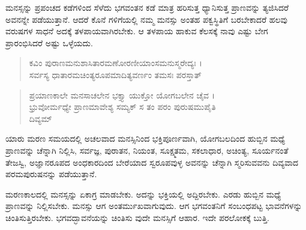 ಮನಸ್ಸನ್ನು ಪ್ರಪಂಚದ ಕಡೆಗಳಿಂದ ಸೆಳೆದು ಭಗವಂತನ ಕಡೆ ಮಾತ್ರ ಹರಿಸುತ್ತ ಧ್ಯಾನಿಸುತ್ತ ಪ್ರಾಣವನ್ನು ತ್ಯಜಿಸಿದರೆ ಅವನನ್ನೇ ಪಡೆಯುತ್ತಾನೆ. ಆದರೆ ಕೊನೆ ಗಳಿಗೆಯಲ್ಲಿ ನಮ್ಮ ಮನಸ್ಸು ಅಂತಹ ಪಕ್ವಸ್ಥಿತಿಗೆ ಬರಬೇಕಾದರೆ ಹಲವು ವರುಷಗಳ ಸಾಧನೆ ಅದಕ್ಕೆ ತಳಪಾಯವಾಗಿರಬೇಕು. ಆ ತಳಪಾಯ ಹಾಕುವ ಕೆಲಸಕ್ಕೆ ನಾವು ಎಷ್ಟು ಬೇಗ ಪ್ರಾರಂಭಿಸಿದರೆ ಅಷ್ಟು ಒಳ್ಳೆಯದು.

\begin{verse}
ಕವಿಂ ಪುರಾಣಮನುಶಾಸಿತಾರಮಣೋರಣೀಯಾಂಸಮನುಸ್ಮರೇದ್ಯಃ ।\\ಸರ್ವಸ್ಯ ಧಾತಾರಮಚಿಂತ್ಯರೂಪಮಾದಿತ್ಯವರ್ಣಂ ತಮಸಃ ಪರಸ್ತಾತ್ 
\end{verse}

\begin{verse}
ಪ್ರಯಾಣಕಾಲೇ ಮನಸಾಚಲೇನ ಭಕ್ತ್ಯಾ ಯುಕ್ತೋ ಯೋಗಬಲೇನ ಚೈವ ।\\ಭ್ರುವೋರ್ಮಧ್ಯೇ ಪ್ರಾಣಮಾವೇಶ್ಯ ಸಮ್ಯಕ್ ಸ ತಂ ಪರಂ ಪುರುಷಮುಪೈತಿ\\ ದಿವ್ಯಮ್ 
\end{verse}

{\small ಯಾರು ಮರಣ ಸಮಯದಲ್ಲಿ ಅಚಲವಾದ ಮನಸ್ಸಿನಿಂದ ಭಕ್ತಿಪೂರ್ಣವಾಗಿ, ಯೋಗಬಲದಿಂದ ಹುಬ್ಬಿನ ಮಧ್ಯೆ ಪ್ರಾಣವನ್ನು ಚೆನ್ನಾಗಿ ನಿಲ್ಲಿಸಿ, ಸರ್ವಜ್ಞ, ಪುರಾತನ, ನಿಯಂತ, ಸೂಕ್ಷ್ಮತಮ, ಸಕಲಾಧಾರ, ಅಚಿಂತ್ಯ, ಸೂರ್ಯನಂತೆ ತೇಜಸ್ವಿ, ಅಜ್ಞಾನರೂಪದ ಅಂಧಕಾರದಿಂದ ಬೇರೆಯಾದ ಸ್ವರೂಪವುಳ್ಳ ಅವನನ್ನು ಚೆನ್ನಾಗಿ ಸ್ಮರಿಸುವವನು ದಿವ್ಯವಾದ ಪರಮಪುರುಷನನ್ನು ಪಡೆಯುತ್ತಾನೆ.}

ಮರಣಕಾಲದಲ್ಲಿ ಮನಸ್ಸನ್ನು ಏಕಾಗ್ರ ಮಾಡಬೇಕು. ಅದನ್ನು ಭಕ್ತಿಯಲ್ಲಿ ಅದ್ದಿರಬೇಕು. ಎರಡು ಹುಬ್ಬಿನ ಮಧ್ಯೆ ಪ್ರಾಣವನ್ನು ನಿಲ್ಲಿಸಬೇಕು. ಮನಸ್ಸು ಆಗ ಅಂತರ್ಮುಖವಾಗುವುದು. ಆಗ ಭಗವಂತನಿಗೆ ಸಂಬಂಧಪಟ್ಟ ಭಾವನೆಗಳನ್ನು ಚಿಂತಿಸುತ್ತಿರಬೇಕು. ಭಗವದ್ಭಾವನೆಯನ್ನು ಚಿಂತಿಸು ವುದೇ ಮನಸ್ಸಿಗೆ ಆಹಾರ. ಇದೇ ಪರಲೋಕಕ್ಕೆ ಬುತ್ತಿ.


